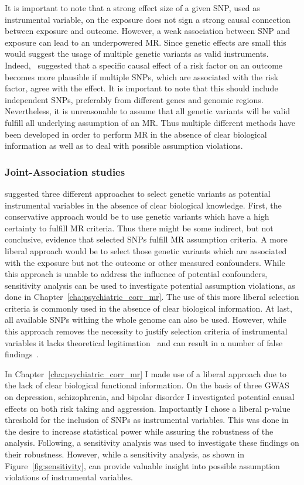 It is important to note that a strong effect size of a given SNP, used as instrumental variable, on the exposure does not sign a strong causal connection between exposure and outcome.
However, a weak association between SNP and exposure can lead to an underpowered MR\@.
Since genetic effects are small this would suggest the usage of multiple genetic variants as valid instruments.
Indeed,~\citet{Burgess2016a} suggested that a specific causal effect of a risk factor on an outcome becomes more plausible if multiple SNPs, which are associated with the risk factor, agree with the effect.
It is important to note that this should include independent SNPs, preferably from different genes and genomic regions.
Nevertheless, it is unreasonable to assume that all genetic variants will be valid fulfill all underlying assumption of an MR\@.
Thus multiple different methods have been developed in order to perform MR in the absence of clear biological information as well as to deal with possible assumption violations.

\subsubsection{Joint-Association studies}
\label{ssub:sensitivity_analysis}

\citet{Burgess2016a} suggested three different approaches to select genetic variants as potential instrumental  variables in the absence of clear biological knowledge.
First, the conservative approach would be to use genetic variants which have a high certainty to fulfill MR criteria.
Thus there might be some indirect, but not conclusive, evidence that selected SNPs fulfill MR assumption criteria.
A more liberal approach would be to select those genetic variants which are associated with the exposure but not the outcome or other measured confounders.
While this approach is unable to address the influence of potential confounders, sensitivity analysis can be used to investigate potential assumption violations, as done in Chapter~\ref{cha:psychiatric_corr_mr}.
The use of this more liberal selection criteria is commonly used in the absence of clear biological information.
At last, all available SNPs withing the whole genome can also be used.
However, while this approach removes the necessity to justify  selection criteria of instrumental variables it lacks theoretical legitimation~\cite{Burgess2016a} and can result in a number of false findings~\cite{Evans2013}.

In Chapter~\ref{cha:psychiatric_corr_mr} I made use of a liberal approach due to the lack of clear biological functional information.
On the basis of three GWAS on depression, schizophrenia, and bipolar disorder I investigated potential causal effects on both risk taking and aggression.
Importantly I chose a liberal p-value threshold for the inclusion of SNPs as instrumental variables.
This was done in the desire to increase statistical power while assuring the robustness of the analysis.
Following, a sensitivity analysis was used to investigate these findings on their robustness.
However, while a sensitivity analysis, as shown in Figure~\ref{fig:sensitivity}, can provide valuable insight into possible assumption violations of instrumental variables.

